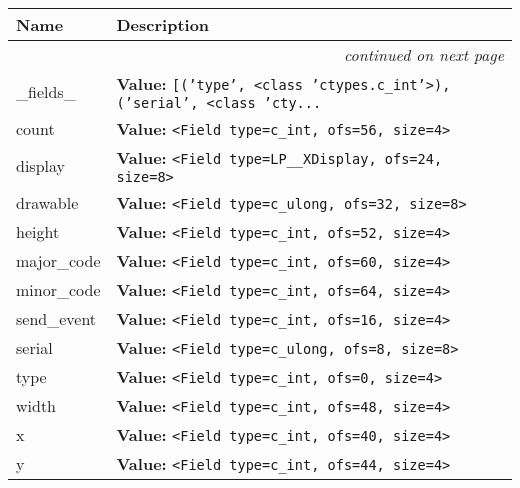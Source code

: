     \vspace{-1cm}
\hspace{\varindent}\begin{longtable}{|p{\varnamewidth}|p{\vardescrwidth}|l}
\cline{1-2}
\cline{1-2} \centering \textbf{Name} & \centering \textbf{Description}& \\
\cline{1-2}
\endhead\cline{1-2}\multicolumn{3}{r}{\small\textit{continued on next page}}\\\endfoot\cline{1-2}
\endlastfoot\raggedright \_\-f\-i\-e\-l\-d\-s\-\_\- & \raggedright \textbf{Value:} 
{\tt \texttt{[}\texttt{(}\texttt{'}\texttt{type}\texttt{'}\texttt{, }{\textless}class 'ctypes.c\_int'{\textgreater}\texttt{)}\texttt{, }\texttt{(}\texttt{'}\texttt{serial}\texttt{'}\texttt{, }{\textless}class 'cty\texttt{...}}&\\
\cline{1-2}
\raggedright c\-o\-u\-n\-t\- & \raggedright \textbf{Value:} 
{\tt {\textless}Field type=c\_int, ofs=56, size=4{\textgreater}}&\\
\cline{1-2}
\raggedright d\-i\-s\-p\-l\-a\-y\- & \raggedright \textbf{Value:} 
{\tt {\textless}Field type=LP\_\_XDisplay, ofs=24, size=8{\textgreater}}&\\
\cline{1-2}
\raggedright d\-r\-a\-w\-a\-b\-l\-e\- & \raggedright \textbf{Value:} 
{\tt {\textless}Field type=c\_ulong, ofs=32, size=8{\textgreater}}&\\
\cline{1-2}
\raggedright h\-e\-i\-g\-h\-t\- & \raggedright \textbf{Value:} 
{\tt {\textless}Field type=c\_int, ofs=52, size=4{\textgreater}}&\\
\cline{1-2}
\raggedright m\-a\-j\-o\-r\-\_\-c\-o\-d\-e\- & \raggedright \textbf{Value:} 
{\tt {\textless}Field type=c\_int, ofs=60, size=4{\textgreater}}&\\
\cline{1-2}
\raggedright m\-i\-n\-o\-r\-\_\-c\-o\-d\-e\- & \raggedright \textbf{Value:} 
{\tt {\textless}Field type=c\_int, ofs=64, size=4{\textgreater}}&\\
\cline{1-2}
\raggedright s\-e\-n\-d\-\_\-e\-v\-e\-n\-t\- & \raggedright \textbf{Value:} 
{\tt {\textless}Field type=c\_int, ofs=16, size=4{\textgreater}}&\\
\cline{1-2}
\raggedright s\-e\-r\-i\-a\-l\- & \raggedright \textbf{Value:} 
{\tt {\textless}Field type=c\_ulong, ofs=8, size=8{\textgreater}}&\\
\cline{1-2}
\raggedright t\-y\-p\-e\- & \raggedright \textbf{Value:} 
{\tt {\textless}Field type=c\_int, ofs=0, size=4{\textgreater}}&\\
\cline{1-2}
\raggedright w\-i\-d\-t\-h\- & \raggedright \textbf{Value:} 
{\tt {\textless}Field type=c\_int, ofs=48, size=4{\textgreater}}&\\
\cline{1-2}
\raggedright x\- & \raggedright \textbf{Value:} 
{\tt {\textless}Field type=c\_int, ofs=40, size=4{\textgreater}}&\\
\cline{1-2}
\raggedright y\- & \raggedright \textbf{Value:} 
{\tt {\textless}Field type=c\_int, ofs=44, size=4{\textgreater}}&\\
\cline{1-2}
\end{longtable}

